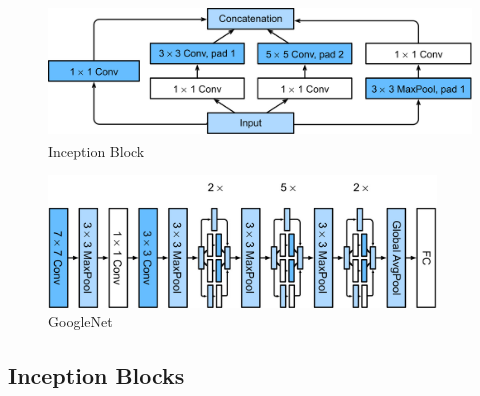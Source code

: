 \begin{table}[H]
    \begin{minipage}{0.45\linewidth}
        \begin{figure}[H]
            \centering
            \includegraphics[width=\linewidth, height=3.5cm, keepaspectratio]{Pictures/convolutional-neural-network/inception-block.jpg}
            \caption*{Inception Block}
        \end{figure}
    \end{minipage}
    \hfill
    \begin{minipage}{0.45\linewidth}
        \begin{figure}[H]
            \centering
            \includegraphics[width=\linewidth, height=3.5cm, keepaspectratio]{Pictures/convolutional-neural-network/inception-full-90-googlenet.jpg}
            \caption*{GoogleNet}
        \end{figure}
    \end{minipage}
\end{table}

\subsection{Inception Blocks \cite{dnn-1}} \label{Inception Blocks}

